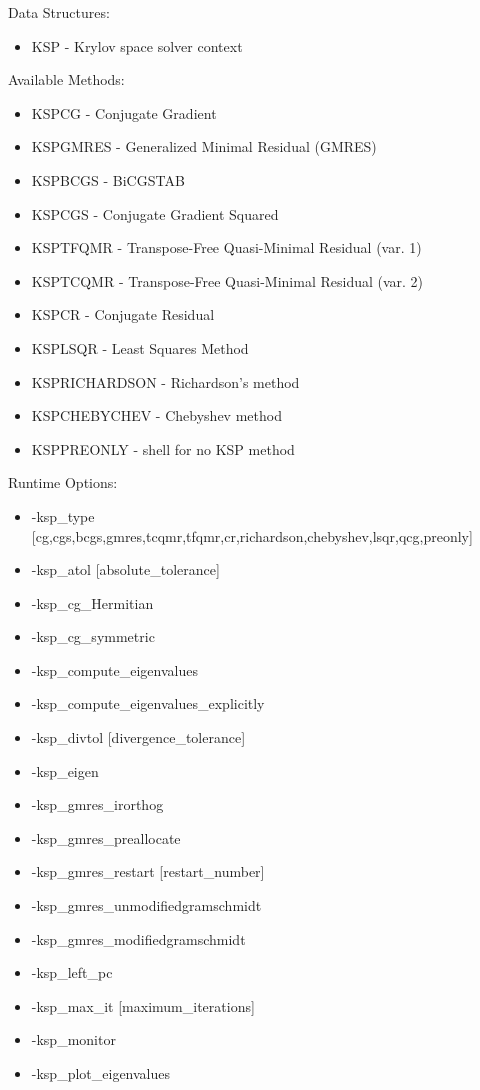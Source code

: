 {\noindent
Data Structures:
\begin{itemize}
\item KSP - Krylov space solver context
\end{itemize}
Available Methods: 
\begin{itemize}
\item KSPCG - Conjugate Gradient
\item KSPGMRES - Generalized Minimal Residual (GMRES)
\item KSPBCGS - BiCGSTAB
\item KSPCGS - Conjugate Gradient Squared
\item KSPTFQMR - Transpose-Free Quasi-Minimal Residual (var. 1)
\item KSPTCQMR - Transpose-Free Quasi-Minimal Residual (var. 2)
\item KSPCR - Conjugate Residual
\item KSPLSQR - Least Squares Method
\item KSPRICHARDSON - Richardson's method
\item KSPCHEBYCHEV - Chebyshev method
\item KSPPREONLY - shell for no KSP method
\end{itemize}
Runtime Options:
\begin{itemize}
\item -ksp\_type [cg,cgs,bcgs,gmres,tcqmr,tfqmr,cr,richardson,chebyshev,lsqr,qcg,preonly]
\item -ksp\_atol [absolute\_tolerance]
\item -ksp\_cg\_Hermitian
\item -ksp\_cg\_symmetric
\item -ksp\_compute\_eigenvalues
\item -ksp\_compute\_eigenvalues\_explicitly
\item -ksp\_divtol [divergence\_tolerance]
\item -ksp\_eigen
\item -ksp\_gmres\_irorthog
\item -ksp\_gmres\_preallocate
\item -ksp\_gmres\_restart [restart\_number]
\item -ksp\_gmres\_unmodifiedgramschmidt
\item -ksp\_gmres\_modifiedgramschmidt
\item -ksp\_left\_pc
\item -ksp\_max\_it [maximum\_iterations]
\item -ksp\_monitor
\item -ksp\_plot\_eigenvalues

\end{itemize}}

